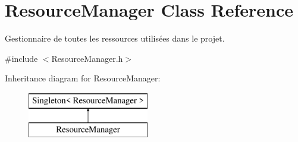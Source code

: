 \hypertarget{class_resource_manager}{}\section{Resource\+Manager Class Reference}
\label{class_resource_manager}


Gestionnaire de toutes les ressources utilisées dans le projet.  




{\ttfamily \#include $<$Resource\+Manager.\+h$>$}

Inheritance diagram for Resource\+Manager\+:\begin{figure}[H]
\begin{center}
\leavevmode
\includegraphics[height=2.000000cm]{class_resource_manager}
\end{center}
\end{figure}
